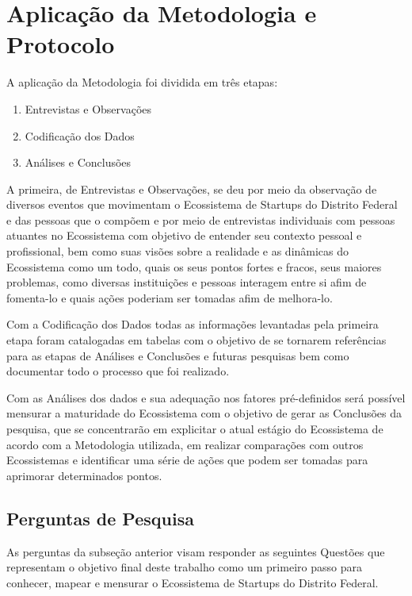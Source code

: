 \section{Aplicação da Metodologia e Protocolo}
\label{section:aplicacao_da_metodologia}

A aplicação da Metodologia foi dividida em três etapas:

\begin{enumerate}
  \item Entrevistas e Observações
  \item Codificação dos Dados
  \item Análises e Conclusões
\end{enumerate}

A primeira, de Entrevistas e Observações, se deu por meio da observação de diversos eventos que movimentam o Ecossistema de Startups do Distrito Federal e das pessoas que o compõem e por meio de entrevistas individuais com pessoas atuantes no Ecossistema com objetivo de entender seu contexto pessoal e profissional, bem como suas visões sobre a realidade e as dinâmicas do Ecossistema como um todo, quais os seus pontos fortes e fracos, seus maiores problemas, como diversas instituições e pessoas interagem entre si afim de fomenta-lo e quais ações poderiam ser tomadas afim de melhora-lo.

Com a Codificação dos Dados todas as informações levantadas pela primeira etapa foram catalogadas em tabelas com o objetivo de se tornarem referências para as etapas de Análises e Conclusões e futuras pesquisas bem como documentar todo o processo que foi realizado. 

Com as Análises dos dados e sua adequação nos fatores pré-definidos será possível mensurar a maturidade do Ecossistema com o objetivo de gerar as Conclusões da pesquisa, que se concentrarão em explicitar o atual estágio do Ecossistema de acordo com a Metodologia utilizada, em realizar comparações com outros Ecossistemas e identificar uma série de ações que podem ser tomadas para aprimorar determinados pontos.

\subsection{Perguntas de Pesquisa}
\label{subsection:questoes_de_pesquisa}

As perguntas da subseção anterior visam responder as seguintes Questões que representam o objetivo final deste trabalho como um primeiro passo para conhecer, mapear e mensurar o Ecossistema de Startups do Distrito Federal.

